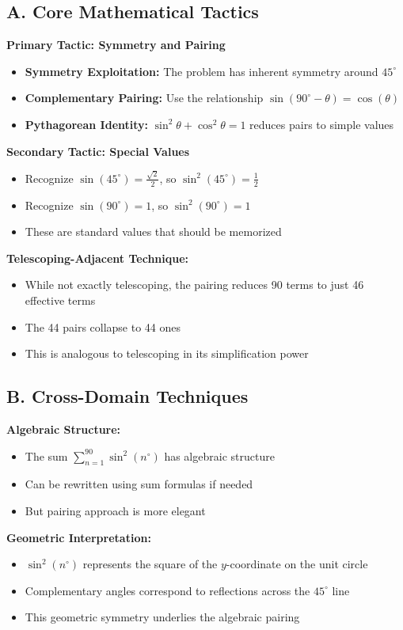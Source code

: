 \documentclass[12pt]{article}
\begin{document}
\begin{tacticalbox}
\subsection*{A. Core Mathematical Tactics}

\textbf{Primary Tactic: Symmetry and Pairing}
\begin{itemize}
    \item \textbf{Symmetry Exploitation:} The problem has inherent symmetry around $45^{\circ}$
    \item \textbf{Complementary Pairing:} Use the relationship $\sin(90^{\circ} - \theta) = \cos(\theta)$
    \item \textbf{Pythagorean Identity:} $\sin^2\theta + \cos^2\theta = 1$ reduces pairs to simple values
\end{itemize}

\textbf{Secondary Tactic: Special Values}
\begin{itemize}
    \item Recognize $\sin(45^{\circ}) = \frac{\sqrt{2}}{2}$, so $\sin^2(45^{\circ}) = \frac{1}{2}$
    \item Recognize $\sin(90^{\circ}) = 1$, so $\sin^2(90^{\circ}) = 1$
    \item These are standard values that should be memorized
\end{itemize}

\textbf{Telescoping-Adjacent Technique:}
\begin{itemize}
    \item While not exactly telescoping, the pairing reduces 90 terms to just 46 effective terms
    \item The 44 pairs collapse to 44 ones
    \item This is analogous to telescoping in its simplification power
\end{itemize}

\subsection*{B. Cross-Domain Techniques}

\textbf{Algebraic Structure:}
\begin{itemize}
    \item The sum $\sum_{n=1}^{90} \sin^2(n^{\circ})$ has algebraic structure
    \item Can be rewritten using sum formulas if needed
    \item But pairing approach is more elegant
\end{itemize}

\textbf{Geometric Interpretation:}
\begin{itemize}
    \item $\sin^2(n^{\circ})$ represents the square of the $y$-coordinate on the unit circle
    \item Complementary angles correspond to reflections across the $45^{\circ}$ line
    \item This geometric symmetry underlies the algebraic pairing
\end{itemize}
\end{tacticalbox}
\end{document}
